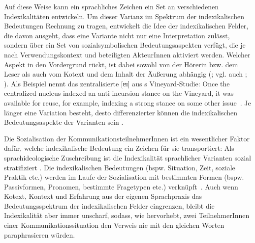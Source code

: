 Auf diese Weise kann ein sprachliches Zeichen ein Set an verschiedenen Indexikalitäten entwickeln. 
Um dieser Varianz im Spektrum der indexikalischen Bedeutungen Rechnung zu tragen, entwickelt \citet{Eckert2008} die Idee der indexikalischen Felder, die davon ausgeht, dass eine Variante nicht nur eine Interpretation zulässt, sondern über ein Set von sozialsymbolischen Bedeutungsaspekten verfügt, die je nach Verwendungskontext und beteiligten AkteurInnen aktiviert werden. 
Welcher Aspekt in den Vordergrund rückt, ist dabei sowohl von der Hörerin bzw. dem Leser als auch vom Kotext und dem Inhalt der Äußerung abhängig (\citealp[s.][466]{Eckert2008}; vgl. auch \citealp[45]{Gumperz.1992b}; \citealp[414]{Ochs1996}). 
Als Beispiel nennt \citet[72]{Eckert.2016} das zentralisierte [ɐɪ] aus \citeauthor{Labov1963}s \citeyear{Labov1963} Vineyard-Studie: {\glqq}Once the centralized nucleus indexed an anti-incursion stance on the Vineyard, it was available for reuse, for example, indexing a strong stance on some other issue{\grqq}~\citep[72]{Eckert.2016}.
Je länger eine Variation besteht, desto differenzierter können die indexikalischen Bedeutungsaspekte der Varianten sein \citep[s.][471]{Eckert2008}.

Die Sozialisation der KommunikationsteilnehmerInnen ist ein wesentlicher Faktor dafür, welche indexikalische Bedeutung ein Zeichen für sie transportiert: 
Als sprachideologische Zuschreibung ist die Indexikalität sprachlicher Varianten sozial stratifiziert \citep[s.][265]{Spitzmuller2013}. 
Die indexikalischen Bedeutungen (bspw. Situation, Zeit, soziale Praktik etc.) werden im Laufe der Sozialisation  mit bestimmten Formen (bspw. Passivformen, Pronomen, bestimmte Fragetypen etc.) verkn{\"u}pft~\citep[s.][410--411]{Ochs1996}.
Auch wenn Kotext, Kontext und Erfahrung aus der eigenen Sprachpraxis das Bedeutungsspektrum der indexikalischen Felder eingrenzen, bleibt die Indexikalität aber immer unscharf, sodass, wie \citet[12--13]{Auer.1995} hervorhebt, zwei TeilnehmerInnen einer Kommunikationssituation den Verweis nie mit den gleichen Worten paraphrasieren würden. 

